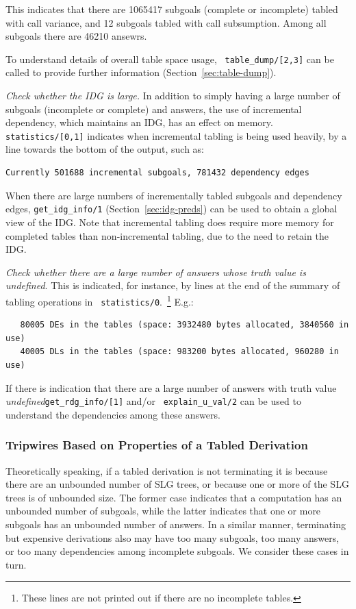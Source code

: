 This indicates that there are 1065417 subgoals (complete or incomplete)
tabled with call variance, and 12 subgoals tabled with call
subsumption.  Among all subgoals there are 46210 ansewrs.  
\bi
\item To understand details of overall table space usage, {\tt
  table\_dump/[2,3]} can be called to provide further information
  (Section~\ref{sec:table-dump}).  
\ei
%
\item {\em Check whether the IDG is large.}  In addition to simply
  having a large number of subgoals (incomplete or complete) and
  answers, the use of incremental dependency, which maintains an IDG,
  has an effect on memory.  {\tt statistics/[0,1]} indicates when
  incremental tabling is being used heavily, by a line towards the
  bottom of the output, such as:
{\small \begin{verbatim}
Currently 501688 incremental subgoals, 781432 dependency edges
\end{verbatim} }
%
\bi
\item When there are large numbers of incrementally tabled subgoals
  and dependency edges, {\tt get\_idg\_info/1}
  (Section~\ref{sec:idg-preds}) can be used to obtain a global view of
  the IDG.  Note that incremental tabling does require more memory for
  completed tables than non-incremental tabling, due to the need to
  retain the IDG.  
\ei
\item {\em Check whether there are a large number of answers whose
  truth value is {\em undefined}}.  This is indicated, for instance,
  by lines at the end of the summary of tabling operations in {\tt
    statistics/0}.~\footnote{These lines are not printed out if there are no
    incomplete tables.}  E.g.:
{\small \begin{verbatim}
   80005 DEs in the tables (space: 3932480 bytes allocated, 3840560 in use)
   40005 DLs in the tables (space: 983200 bytes allocated, 960280 in use)
\end{verbatim} }
%
\bi
If there is indication that there are a large number of answers with
 truth value {\em undefined}{\tt get\_rdg\_info/[1]} and/or {\tt
 explain\_u\_val/2} can be used to understand the dependencies among
 these answers.  
\ei
\ei

\subsubsection{Tripwires Based on Properties of a Tabled Derivation}
%
Theoretically speaking, if a tabled derivation is not terminating it
is because there are an unbounded number of SLG trees, or because one
or more of the SLG trees is of unbounded size.  The former case
indicates that a computation has an unbounded number of subgoals,
while the latter indicates that one or more subgoals has an unbounded
number of answers.  In a similar manner, terminating but expensive
derivations also may have too many subgoals, too many answers, or too
many dependencies among incomplete subgoals.  We consider these cases
in turn.

